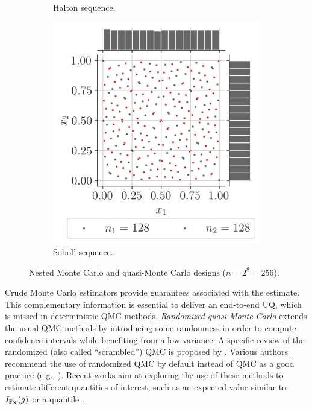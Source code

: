 \begin{figure}[ht]
\begin{subfigure}[b]{0.32\textwidth}
        \caption{Halton sequence.}
    \end{subfigure}
    \hfill
    \begin{subfigure}[b]{0.32\textwidth}
        \centering
        \includegraphics[width=\textwidth]{../numerical_experiments/chapter1/figures/quasi_MonteCarlo_256.png}
        \caption{Sobol' sequence.}
    \end{subfigure}
       \caption{Nested Monte Carlo and quasi-Monte Carlo designs ($n=2^8=256$).}
       \label{fig:quasi_monte_carlo_designs}
\end{figure}

Crude Monte Carlo estimators provide guarantees associated with the estimate. 
This complementary information is essential to deliver an end-to-end UQ, which is missed in deterministic QMC methods.  
\textit{Randomized quasi-Monte Carlo} extends the usual QMC methods by introducing some randomness in order to compute confidence intervals while benefiting from a low variance. 
A specific review of the randomized (also called ``scrambled'') QMC is proposed by \citet{lecuyer_2018}. 
Various authors recommend the use of randomized QMC by default instead of QMC as a good practice (e.g., \citealp{owen_2013}). 
Recent works aim at exploring the use of these methods to estimate different quantities of interest, such as an expected value similar to $I_{\mathbb{P}_{{\bf X}}}(g)$ \citep{gobet_2022} or a quantile \citep{tuffin_2019}. 

